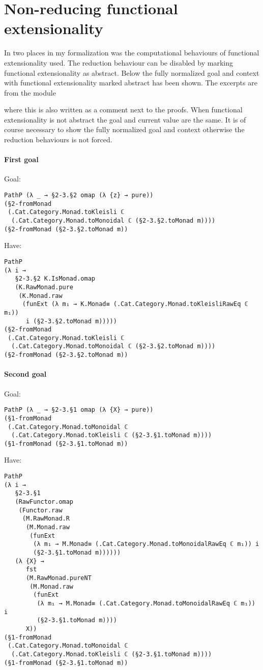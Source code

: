 \chapter{Non-reducing functional extensionality}
\label{app:abstract-funext}
In two places in my formalization was the computational behaviours of
functional extensionality used. The reduction behaviour can be
disabled by marking functional extensionality as abstract. Below the
fully normalized goal and context with functional extensionality
marked abstract has been shown. The excerpts are from the module
%
\begin{center}
\end{center}
%
where this is also written as a comment next to the proofs. When
functional extensionality is not abstract the goal and current value
are the same. It is of course necessary to show the fully normalized
goal and context otherwise the reduction behaviours is not forced.

\subsubsection*{First goal}
Goal:
\begin{verbatim}
PathP (λ _ → §2-3.§2 omap (λ {z} → pure))
(§2-fromMonad
 (.Cat.Category.Monad.toKleisli ℂ
  (.Cat.Category.Monad.toMonoidal ℂ (§2-3.§2.toMonad m))))
(§2-fromMonad (§2-3.§2.toMonad m))
\end{verbatim}
Have:
\begin{verbatim}
PathP
(λ i →
   §2-3.§2 K.IsMonad.omap
   (K.RawMonad.pure
    (K.Monad.raw
     (funExt (λ m₁ → K.Monad≡ (.Cat.Category.Monad.toKleisliRawEq ℂ m₁))
      i (§2-3.§2.toMonad m)))))
(§2-fromMonad
 (.Cat.Category.Monad.toKleisli ℂ
  (.Cat.Category.Monad.toMonoidal ℂ (§2-3.§2.toMonad m))))
(§2-fromMonad (§2-3.§2.toMonad m))
\end{verbatim}
\subsubsection*{Second goal}
Goal:
\begin{verbatim}
PathP (λ _ → §2-3.§1 omap (λ {X} → pure))
(§1-fromMonad
 (.Cat.Category.Monad.toMonoidal ℂ
  (.Cat.Category.Monad.toKleisli ℂ (§2-3.§1.toMonad m))))
(§1-fromMonad (§2-3.§1.toMonad m))
\end{verbatim}
Have:
\begin{verbatim}
PathP
(λ i →
   §2-3.§1
   (RawFunctor.omap
    (Functor.raw
     (M.RawMonad.R
      (M.Monad.raw
       (funExt
        (λ m₁ → M.Monad≡ (.Cat.Category.Monad.toMonoidalRawEq ℂ m₁)) i
        (§2-3.§1.toMonad m))))))
   (λ {X} →
      fst
      (M.RawMonad.pureNT
       (M.Monad.raw
        (funExt
         (λ m₁ → M.Monad≡ (.Cat.Category.Monad.toMonoidalRawEq ℂ m₁)) i
         (§2-3.§1.toMonad m))))
      X))
(§1-fromMonad
 (.Cat.Category.Monad.toMonoidal ℂ
  (.Cat.Category.Monad.toKleisli ℂ (§2-3.§1.toMonad m))))
(§1-fromMonad (§2-3.§1.toMonad m))
\end{verbatim}
